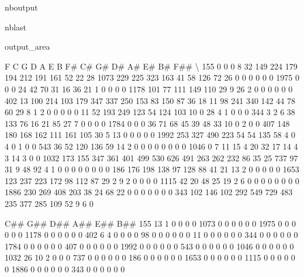 \documentclass[letterpaper,10pt,english]{sphinxmanual}
\begin{document}
\begin{sphinxuseclass}{nboutput}
\begin{sphinxuseclass}{nblast}
{\begin{sphinxuseclass}{output_area}
\begin{sphinxuseclass}{}
\begin{sphinxVerbatim}[commandchars=\\\{\}]
        F    C    G    D    A    E    B   F\#   C\#   G\#   D\#   A\#  E\#  B\#  F\#\#  \textbackslash{}
155     0    0    0    8   32  149  224  179  194  212  191  161  52  22   28
1073  229  225  323  163   41   58  126   72   26    0    0    0   0   0    0
1975    0    0    0   24   42   70   31   16   36   21    1    0   0   0    0
1178  101   77  111  149  110   29    9   26    2    0    0    0   0   0    0
402    13  100  214  103  179  347  337  250  153   83  150   87  36  18   11
98    241  340  142   44   78   60   29    8    1    2    0    0   0   0    0
11     52  193  249  123   54  124  103   10    0   28    4    1   0   0    0
344     3    2    6   38  133   76   16   21   85   27    7    0   0   0    0
1784    0    0    0   36   71   68   45   39   48   33   10    0   2   0    0
407   148  180  168  162  111  161  105   30    5   13    0    0   0   0    0
1992  253  327  490  223   54   54  135   58    4    0    4    0   1   0    0
543    36   52  120  136   59   14    2    0    0    0    0    0   0   0    0
1046    0    7   11   15    4   20   32   17   14    4    3   14   3   0    0
1032  173  155  347  361  401  499  530  626  491  263  262  232  86  35   25
737    97   31    9   48   92    4    1    0    0    0    0    0   0   0    0
186   176  198  138   97  128   88   41   21   13    2    0    0   0   0    0
1653  123  237  223  172   98  112   87   29    2    9    2    0   0   0    0
1115   42   20   48   25   19    2    6    0    0    0    0    0   0   0    0
1886  230  269  408  203   38   24   68   22    0    0    0    0   0   0    0
343   102  146  102  292  549  729  483  235  377  285  109   52   9   6    0

      C\#\#  G\#\#  D\#\#  A\#\#  E\#\#  B\#\#
155    13    1    0    0    0    0
1073    0    0    0    0    0    0
1975    0    0    0    0    0    0
1178    0    0    0    0    0    0
402     6    4    0    0    0    0
98      0    0    0    0    0    0
11      0    0    0    0    0    0
344     0    0    0    0    0    0
1784    0    0    0    0    0    0
407     0    0    0    0    0    0
1992    0    0    0    0    0    0
543     0    0    0    0    0    0
1046    0    0    0    0    0    0
1032   26   10    2    0    0    0
737     0    0    0    0    0    0
186     0    0    0    0    0    0
1653    0    0    0    0    0    0
1115    0    0    0    0    0    0
1886    0    0    0    0    0    0
343     0    0    0    0    0    0
\end{sphinxVerbatim}



\end{sphinxuseclass}
\end{sphinxuseclass}
}

\end{sphinxuseclass}
\end{sphinxuseclass}
\end{document}
